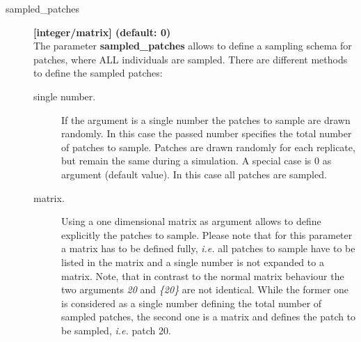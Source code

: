 \documentclass[letterpaper,12pt,oneside]{book}
\begin{document}
\begin{description}
\item[sampled\_patches] \textbf{[integer/matrix] (default: 0)}\\ 
The parameter \textbf{sampled\_patches} allows to define a sampling schema for patches, where ALL individuals are sampled. There are different methods to define the sampled patches:
\begin{description}
\item[single number.] If the argument is a single number the patches to sample are drawn randomly. In this case the passed number specifies the total number of patches to sample. Patches are drawn randomly for each replicate, but remain the same during a simulation. A special case is 0 as argument (default value). In this case all patches are sampled. 
\item[matrix.] Using a one dimensional matrix as argument allows to define explicitly the patches to sample. Please note that for this parameter a matrix has to be defined fully, \textit{i.e.} all patches to sample have to be listed in the matrix and a single number is not expanded to a matrix. Note, that in contrast to the normal matrix behaviour the two arguments \textit{20} and \textit{\{20\}} are not identical. While the former one is considered as a single number defining the total number of sampled patches, the second one is a matrix and defines the patch to be sampled, \textit{i.e.} patch 20.  
\end{description}


\end{description}
\end{document}
